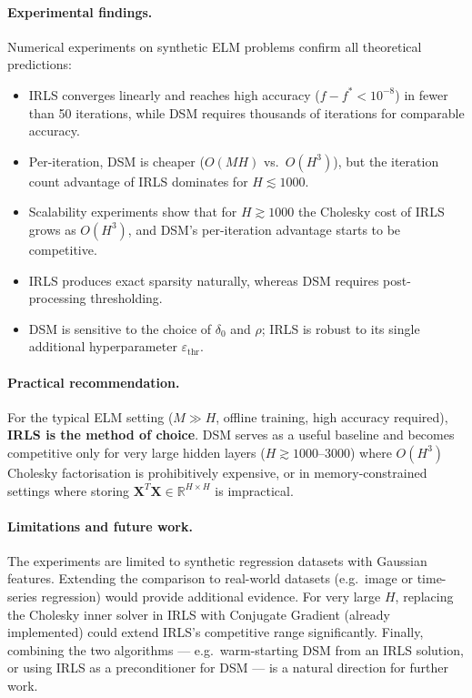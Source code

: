 \paragraph{Experimental findings.}
Numerical experiments on synthetic ELM problems confirm all theoretical predictions:
\begin{itemize}
    \item IRLS converges linearly and reaches high accuracy ($f - f^* < 10^{-8}$)
    in fewer than 50 iterations, while DSM requires thousands of iterations for
    comparable accuracy.
    \item Per-iteration, DSM is cheaper ($O(MH)$ vs.\ $O(H^3)$), but the iteration
    count advantage of IRLS dominates for $H \lesssim 1000$.
    \item Scalability experiments show that for $H \gtrsim 1000$ the Cholesky cost
    of IRLS grows as $O(H^3)$, and DSM's per-iteration advantage starts to be
    competitive.
    \item IRLS produces exact sparsity naturally, whereas DSM requires post-processing
    thresholding.
    \item DSM is sensitive to the choice of $\delta_0$ and $\rho$; IRLS is robust to
    its single additional hyperparameter $\varepsilon_{\mathrm{thr}}$.
\end{itemize}

\paragraph{Practical recommendation.}
For the typical ELM setting ($M \gg H$, offline training, high accuracy required),
\textbf{IRLS is the method of choice}.
DSM serves as a useful baseline and becomes competitive only for very large hidden
layers ($H \gtrsim 1000$--$3000$) where $O(H^3)$ Cholesky factorisation is
prohibitively expensive, or in memory-constrained settings where storing
$\mathbf{X}^T\mathbf{X} \in \mathbb{R}^{H \times H}$ is impractical.

\paragraph{Limitations and future work.}
The experiments are limited to synthetic regression datasets with Gaussian features.
Extending the comparison to real-world datasets (e.g.\ image or time-series regression)
would provide additional evidence.
For very large $H$, replacing the Cholesky inner solver in IRLS with Conjugate
Gradient (already implemented) could extend IRLS's competitive range significantly.
Finally, combining the two algorithms — e.g.\ warm-starting DSM from an IRLS solution,
or using IRLS as a preconditioner for DSM — is a natural direction for further work.
